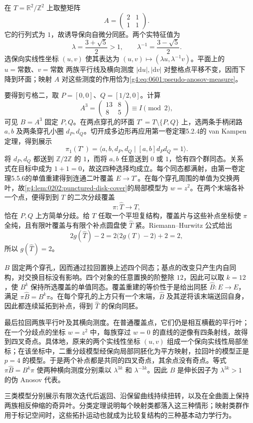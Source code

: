 \begin{example}\label{g4:exm:0601:pseudo-anosov-model}
	在 \(T=\mathbb R^2/\mathbb Z^2\) 上取整矩阵
	\[
		A=\begin{pmatrix}2&1\\1&1\end{pmatrix}.
	\]
	它的行列式为 \(1\)，故诱导保向自微分同胚。两个实特征值为
	\[
		\lambda=\frac{3+\sqrt5}{2}>1,
		\qquad\lambda^{-1}=\frac{3-\sqrt5}{2}.
	\]
	选保向实线性坐标 \((u,v)\) 使其表达为 \((u,v)\mapsto(\lambda u,\lambda^{-1}v)\)。平面上的 \(u=\text{常数}\)、\(v=\text{常数}\) 两族平行线及横向测度 \(|\mathrm{d}u|,|\mathrm{d}v|\) 对整格点平移不变，因而下降到环面；映射 \(A\) 对这些测度的作用恰为\eqref{g4:eq:0601:pseudo-anosov-measure}。

	要得到亏格二，取 \(P=[0,0]\)、\(Q=[1/2,0]\)。计算
	\[
		A^3=\begin{pmatrix}13&8\\8&5\end{pmatrix}\equiv I\pmod2,
	\]
	可见 \(B=A^3\) 固定 \(P,Q\)。在两点穿孔的环面 \(T^\circ=T\setminus\{P,Q\}\) 上，选两条手柄闭路 \(a,b\) 及两条穿孔小圈 \(d_P,d_Q\)。切开成多边形再应用第一卷定理5.2.4的 van Kampen 定理，得到展示
	\[
		\pi_1(T^\circ)=
		\langle a,b,d_P,d_Q\mid[a,b]d_Pd_Q=1\rangle.
	\]
	将 \(d_P,d_Q\) 都送到 \(\mathbb Z/2\mathbb Z\) 的 \(1\)，而将 \(a,b\) 任意送到 \(0\) 或 \(1\)，恰有四个群同态。关系式在目标中成为 \(1+1=0\)，故这四种选择均成立。每个同态都满射，由第一卷定理5.5.6的单值重建得到连通二叶覆盖 \(E\to T^\circ\)。在每个穿孔周围的单值为交换两叶，故\cref{g4:lem:0202:punctured-disk-cover}的局部模型为 \(w=z^2\)。在两个末端各补一个点，便得到到 \(T\) 的二次分歧覆盖
	\[
		\pi:\widehat T\longrightarrow T,
	\]
	恰在 \(P,Q\) 上方简单分歧。给 \(T\) 任取一个平坦复结构，覆盖片与这些补点坐标使 \(\pi\) 全纯，且有限叶覆盖与有限个补点圆盘使 \(\widehat T\) 紧。Riemann--Hurwitz 公式给出
	\[
		2g(\widehat T)-2=2\bigl(2g(T)-2\bigr)+2=2,
	\]
	所以 \(g(\widehat T)=2\)。

	\(B\) 固定两个穿孔，因而通过拉回置换上述四个同态；基点的改变只产生内自同构，对交换目标没有影响。四个对象的任意置换的阶整除 \(12\)，因此可以取 \(k=12\)，使 \(B^k\) 保持所选覆盖的单值同态。覆盖重建的等价性于是给出同胚 \(\widehat B:E\to E\)，满足 \(\pi\widehat B=B^k\pi\)。在每个穿孔的上方只有一个末端，\(\widehat B\) 及其逆将该末端送回自身，因此都连续延拓到补点，得到 \(\widehat T\) 的保向同胚。

	最后拉回两族平行叶及其横向测度。在普通覆盖点，它们仍是相互横截的平行叶；在一个分歧点的坐标 \(w=z^2\) 中，每族穿过 \(w=0\) 的直线的逆像有四条射线，故得到四叉奇点。具体地，原来的两个实线性坐标 \((u,v)\) 组成一个保向实线性局部坐标；在该坐标中，二重分歧模型经保向局部同胚化为平方映射，拉回叶的模型正是 \(p=4\) 的模型。于是两个补点都是共同的四叉奇点，其余点没有奇点。等式 \(\pi\widehat B=B^k\pi\) 使两种横向测度分别乘以 \(\lambda^{3k}\) 和 \(\lambda^{-3k}\)。因此 \(\widehat B\) 是伸长因子为 \(\lambda^{3k}>1\) 的伪 Anosov 代表。
\end{example}

三类模型分别展示有限次迭代后返回、沿保留曲线持续扭转，以及在全曲面上保持两族相反伸缩的奇异叶。分类定理说明每个映射类都落入这三种情形；映射类群作用于标记空间时，这些拓扑运动也就成为比较复结构的三种基本动力学行为。

